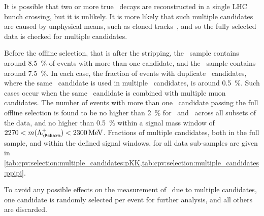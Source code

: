 It is possible that two or more true \LcTophh\ decays are reconstructed in a 
single \ac{LHC} bunch crossing, but it is unlikely.
It is more likely that such multiple candidates are caused by unphysical means, 
such as cloned tracks~\cite{LHCb-INT-2011-009}, and so the fully selected data 
is checked for multiple candidates.

Before the offline selection, that is after the stripping, the \pKK\ sample 
contains around \SI{8.5}{\percent} of events with more than one candidate, and 
the \ppipi\ sample contains around \SI{7.5}{\percent}.
In each case, the fraction of events with duplicate \PLambdac\ candidates, 
where the same \PLambdac\ candidate is used in multiple \PLambdab\ candidates, 
is around \SI{0.5}{\percent}.
Such cases occur when the same \PLambdac\ candidate is combined with multiple 
muon candidates.
The number of events with more than one \PLambdab\ candidate passing the full 
offline selection is found to be no higher than \SI{2}{\percent} for \pKK\ and 
\ppipi\ across all subsets of the data, and no higher than \SI{0.5}{\percent} 
within a signal mass window of $2270 < m(\PLambdac) < \SI{2300}{\MeV}$.
Fractions of multiple candidates, both in the full sample, and within the 
defined signal windows, for all data sub-samples are given in 
\cref{tab:cpv:selection:multiple_candidates:pKK,tab:cpv:selection:multiple_candidates:ppipi}.

To avoid any possible effects on the measurement of \dACP\ due to multiple 
candidates, one candidate is randomly selected per event for further analysis, 
and all others are discarded.

\begin{table}
  \caption{%
    Statistics on multiple candidates in the \pKK\ data.
    The total number of events $N_{\text{Events}}$ is the number of 
    proton-proton collisions that make up the data sub-sample, and 
    $N_{\text{Candidates}}$ is the number of \PLambdac\ candidates.
    The fraction of events containing at least two candidates is 
    $f_{\text{Multiple}}$, and the fraction of those events that fall within 
    the signal window in the \PLambdac\ mass distribution is 
    $f_{\text{Multiple, sig.}}$.
  }
  \label{tab:cpv:selection:multiple_candidates:pKK}
    
\end{table}

